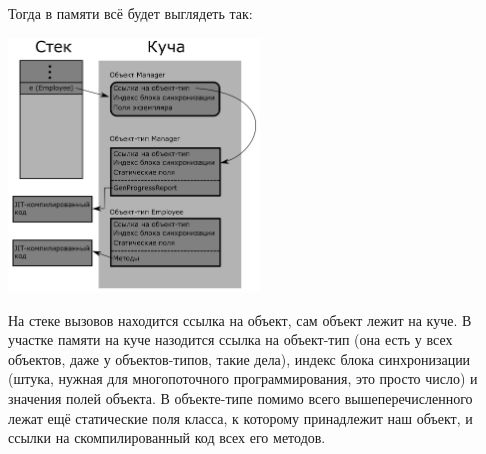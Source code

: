 \documentclass[a5paper]{article}
\begin{document}
Тогда в памяти всё будет выглядеть так:

\begin{center}
	\includegraphics[width=0.5\textwidth]{objectInMemory.png}
\end{center}

На стеке вызовов находится ссылка на объект, сам объект лежит на куче. В участке памяти на куче назодится ссылка на объект-тип (она есть у всех объектов, даже у объектов-типов, такие дела), индекс блока синхронизации (штука, нужная для многопоточного программирования, это просто число) и значения полей объекта. В объекте-типе помимо всего вышеперечисленного лежат ещё статические поля класса, к которому принадлежит наш объект, и ссылки на скомпилированный код всех его методов.
\end{document}
